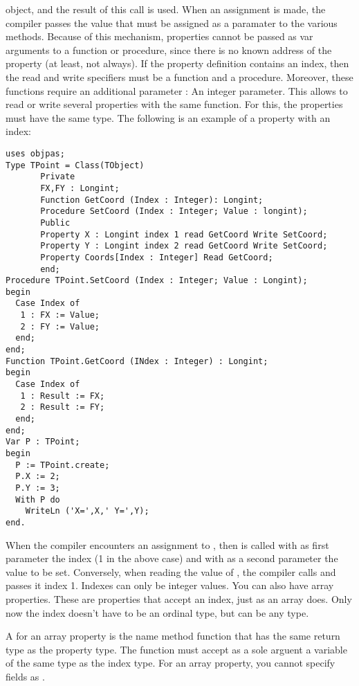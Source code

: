 \documentclass{report}
\begin{document}
object, and the result of this call is used. When an assignment is made,
the compiler passes the value that must be assigned as a paramater to
the various  methods.
Because of this mechanism, properties cannot be passed as var arguments to a
function or procedure, since there is no known address of the property (at
least, not always).
If the property definition contains an index, then the read and write
specifiers must be a function and a procedure. Moreover, these functions
require an additional parameter : An integer parameter. This allows to read
or write several properties with the same function. For this, the properties
must have the same type.
The following is an example of a property with an index:
\begin{verbatim}
uses objpas;
Type TPoint = Class(TObject)
       Private
       FX,FY : Longint;
       Function GetCoord (Index : Integer): Longint;
       Procedure SetCoord (Index : Integer; Value : longint);
       Public
       Property X : Longint index 1 read GetCoord Write SetCoord;
       Property Y : Longint index 2 read GetCoord Write SetCoord;
       Property Coords[Index : Integer] Read GetCoord;
       end;
Procedure TPoint.SetCoord (Index : Integer; Value : Longint);
begin
  Case Index of
   1 : FX := Value;
   2 : FY := Value;
  end;
end;
Function TPoint.GetCoord (INdex : Integer) : Longint;
begin
  Case Index of
   1 : Result := FX;
   2 : Result := FY;
  end;
end;
Var P : TPoint;
begin
  P := TPoint.create;
  P.X := 2;
  P.Y := 3;
  With P do
    WriteLn ('X=',X,' Y=',Y);
end.
\end{verbatim}
When the compiler encounters an assignment to , then 
is called with as first parameter the index (1 in the above case) and with
as a second parameter the value to be set.
Conversely, when reading the value of , the compiler calls
 and passes it index 1.
Indexes can only be integer values.
You can also have array properties. These are properties that accept an
index, just as an array does. Only now the index doesn't have to be an
ordinal type, but can be any type.

A  for an array property is the name method function
that has the same return type as  the property type.
The function must accept as a sole arguent a variable of the same type as
the index type. For an array property, you cannot specify fields as .
\end{document}
